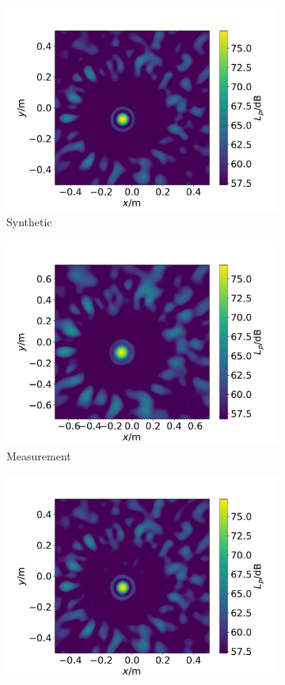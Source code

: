 \documentclass[12pt,pdftex,16x10]{elpres} %
\begin{document}
\begin{psli}
  \begin{figure}
    \begin{subfigure}[b]{0.45\linewidth}
      \centering
      \includegraphics[width=0.5\linewidth]{figs/datasets_beamforming_example_synthetic.pdf} 
      \caption{Synthetic} 
    \end{subfigure}%
    \begin{subfigure}[b]{0.45\linewidth}
      \centering
      \includegraphics[width=0.5\linewidth]{figs/datasets_beamforming_example_measurement.pdf} 
      \caption{Measurement} 
    \end{subfigure} 
    \begin{subfigure}[b]{0.45\linewidth}
      \centering
      \includegraphics[width=0.5\linewidth]{figs/data_augmentation_evals_augmented_csm.pdf} 

\end{subfigure}
\end{figure}
\end{psli}
\end{document}
